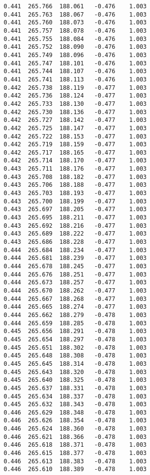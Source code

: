 \begin{verbatim}
   0.441  265.766  188.061   -0.476    1.003
   0.441  265.763  188.067   -0.476    1.003
   0.441  265.760  188.073   -0.476    1.003
   0.441  265.757  188.078   -0.476    1.003
   0.441  265.755  188.084   -0.476    1.003
   0.441  265.752  188.090   -0.476    1.003
   0.441  265.749  188.096   -0.476    1.003
   0.441  265.747  188.101   -0.476    1.003
   0.441  265.744  188.107   -0.476    1.003
   0.441  265.741  188.113   -0.476    1.003
   0.442  265.738  188.119   -0.477    1.003
   0.442  265.736  188.124   -0.477    1.003
   0.442  265.733  188.130   -0.477    1.003
   0.442  265.730  188.136   -0.477    1.003
   0.442  265.727  188.142   -0.477    1.003
   0.442  265.725  188.147   -0.477    1.003
   0.442  265.722  188.153   -0.477    1.003
   0.442  265.719  188.159   -0.477    1.003
   0.442  265.717  188.165   -0.477    1.003
   0.442  265.714  188.170   -0.477    1.003
   0.443  265.711  188.176   -0.477    1.003
   0.443  265.708  188.182   -0.477    1.003
   0.443  265.706  188.188   -0.477    1.003
   0.443  265.703  188.193   -0.477    1.003
   0.443  265.700  188.199   -0.477    1.003
   0.443  265.697  188.205   -0.477    1.003
   0.443  265.695  188.211   -0.477    1.003
   0.443  265.692  188.216   -0.477    1.003
   0.443  265.689  188.222   -0.477    1.003
   0.443  265.686  188.228   -0.477    1.003
   0.444  265.684  188.234   -0.477    1.003
   0.444  265.681  188.239   -0.477    1.003
   0.444  265.678  188.245   -0.477    1.003
   0.444  265.676  188.251   -0.477    1.003
   0.444  265.673  188.257   -0.477    1.003
   0.444  265.670  188.262   -0.477    1.003
   0.444  265.667  188.268   -0.477    1.003
   0.444  265.665  188.274   -0.477    1.003
   0.444  265.662  188.279   -0.478    1.003
   0.444  265.659  188.285   -0.478    1.003
   0.445  265.656  188.291   -0.478    1.003
   0.445  265.654  188.297   -0.478    1.003
   0.445  265.651  188.302   -0.478    1.003
   0.445  265.648  188.308   -0.478    1.003
   0.445  265.645  188.314   -0.478    1.003
   0.445  265.643  188.320   -0.478    1.003
   0.445  265.640  188.325   -0.478    1.003
   0.445  265.637  188.331   -0.478    1.003
   0.445  265.634  188.337   -0.478    1.003
   0.445  265.632  188.343   -0.478    1.003
   0.446  265.629  188.348   -0.478    1.003
   0.446  265.626  188.354   -0.478    1.003
   0.446  265.624  188.360   -0.478    1.003
   0.446  265.621  188.366   -0.478    1.003
   0.446  265.618  188.371   -0.478    1.003
   0.446  265.615  188.377   -0.478    1.003
   0.446  265.613  188.383   -0.478    1.003
   0.446  265.610  188.389   -0.478    1.003

\end{verbatim}
